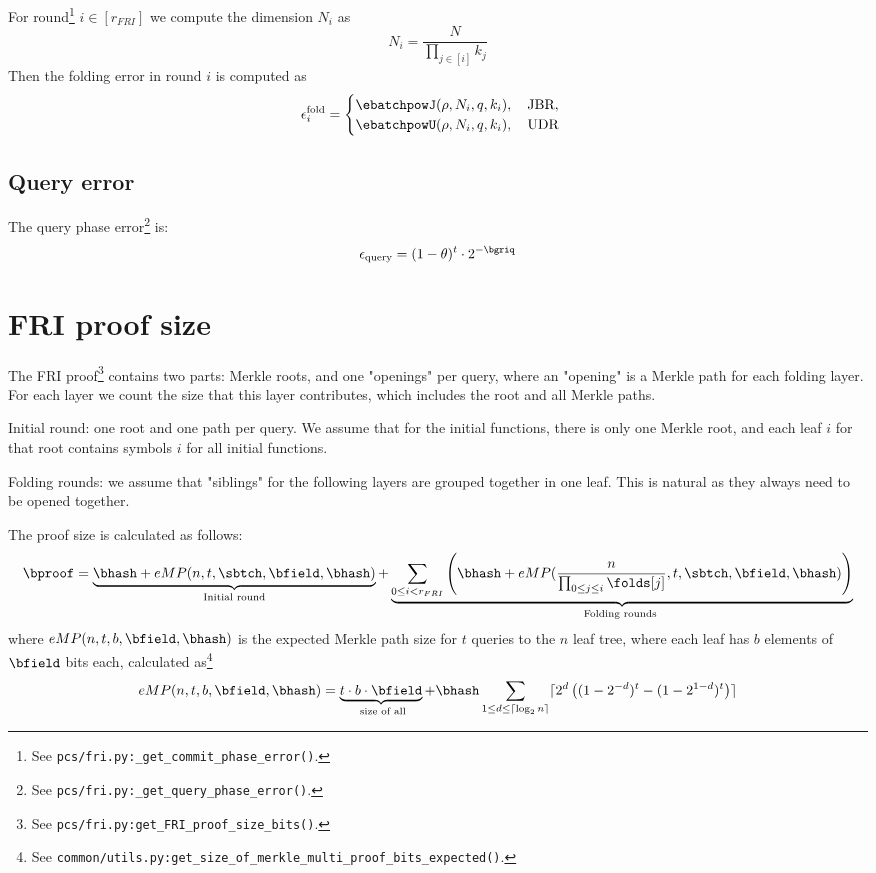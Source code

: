 For round\footnote{See \texttt{pcs/fri.py:\_get\_commit\_phase\_error()}.} $i\in[r_{FRI}]$ we compute the dimension $N_i$ as
$$
N_i = \frac{N}{\prod_{j\in[i]}k_j}
$$
Then the folding error in round $i$ is computed as
\begin{equation}
    \epsilon_{i}^{\mathrm{fold}} =
\begin{cases}
   \ebatchpowJ(\rho,N_i,q,k_i ),\quad \text{JBR}, \\
   \ebatchpowU(\rho,N_i,q,k_i ),\quad \text{UDR}
\end{cases}
\end{equation}

\subsection{Query error}

The query phase error\footnote{See \texttt{pcs/fri.py:\_get\_query\_phase\_error()}.} is:
\begin{equation}
    \epsilon_{\mathrm{query}} = (1-\theta)^{t}\cdot 2^{-\bgriq}
\end{equation}

\newpage
\section{FRI proof size}

The FRI proof\footnote{See \texttt{pcs/fri.py:get\_FRI\_proof\_size\_bits()}.} contains two parts: Merkle roots, and one "openings" per query,
  where an "opening" is a Merkle path for each folding layer.
     For each layer we count the size that
     this layer contributes, which includes the root and all Merkle paths.

Initial round: one root and one path per query.
     We assume that for the initial functions, there is only one Merkle root, and
     each leaf $i$ for that root contains symbols $i$ for all initial functions.

    Folding rounds:
     we assume that "siblings" for the following layers are grouped together
     in one leaf. This is natural as they always need to be opened together.

The proof size is calculated as follows:
\begin{multline}
    \bproof =   \underbrace{ \bhash+  eMP(n,  t ,\sbtch,\bfield,\bhash)}_{\text{Initial round}} + \underbrace{\sum_{0\leq i < r_{FRI} } \left(\bhash+
      eMP(\frac{n}{\prod_{0\leq j \leq  i} \folds[j]},  t ,\sbtch,\bfield,\bhash)\right)}_{\text{Folding rounds }}
    \end{multline}
where $eMP(n, t, b, \bfield, \bhash)$ is the expected Merkle path size for $t$ queries to the $n$ leaf tree,
where each leaf has $b$ elements of $\bfield$ bits each,
calculated as\footnote{See \texttt{common/utils.py:get\_size\_of\_merkle\_multi\_proof\_bits\_expected()}.}
\begin{equation}
    eMP(n,t, b,\bfield,\bhash) =   \underbrace{t\cdot b\cdot \bfield}_{\text{ size of all}}
    +\bhash\sum_{1\leq d\leq \lceil \log_{2} n\rceil}\lceil 2^d\left((1-2^{-d})^t-(1-2^{1-d})^t\right)\rceil
\end{equation}